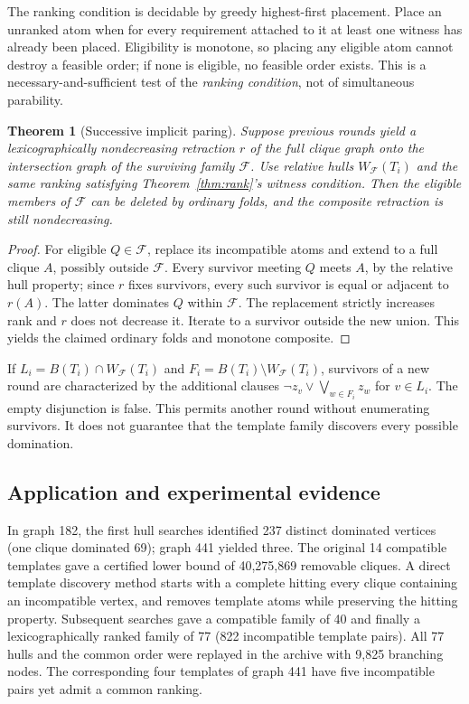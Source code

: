 \documentclass[11pt,a4paper]{article}
\newtheorem{theorem}{Theorem}[section]
\theoremstyle{definition}\newtheorem{definition}[theorem]{Definition}\newtheorem{example}[theorem]{Example}
\theoremstyle{remark}\newtheorem{remark}[theorem]{Remark}
\begin{document}
The ranking condition is decidable by greedy highest-first placement. Place an unranked atom when for every requirement attached to it at least one witness has already been placed. Eligibility is monotone, so placing any eligible atom cannot destroy a feasible order; if none is eligible, no feasible order exists. This is a necessary-and-sufficient test of the \emph{ranking condition}, not of simultaneous parability.
\begin{theorem}[Successive implicit paring]\label{thm:relative}
Suppose previous rounds yield a lexicographically nondecreasing retraction \(r\) of the full clique graph onto the intersection graph of the surviving family \(\mathcal F\). Use relative hulls \(W_{\mathcal F}(T_i)\) and the same ranking satisfying Theorem~\ref{thm:rank}'s witness condition. Then the eligible members of \(\mathcal F\) can be deleted by ordinary folds, and the composite retraction is still nondecreasing.
\end{theorem}
\begin{proof}
For eligible \(Q\in\mathcal F\), replace its incompatible atoms and extend to a full clique \(A\), possibly outside \(\mathcal F\). Every survivor meeting \(Q\) meets \(A\), by the relative hull property; since \(r\) fixes survivors, every such survivor is equal or adjacent to \(r(A)\). The latter dominates \(Q\) within \(\mathcal F\). The replacement strictly increases rank and \(r\) does not decrease it. Iterate to a survivor outside the new union. This yields the claimed ordinary folds and monotone composite.
\end{proof}
If \(L_i=B(T_i)\cap W_{\mathcal F}(T_i)\) and \(F_i=B(T_i)\setminus W_{\mathcal F}(T_i)\), survivors of a new round are characterized by the additional clauses \(\neg z_v\lor\bigvee_{w\in F_i}z_w\) for \(v\in L_i\). The empty disjunction is false. This permits another round without enumerating survivors. It does not guarantee that the template family discovers every possible domination.

\subsection{Application and experimental evidence}
In graph 182, the first hull searches identified 237 distinct dominated vertices (one clique dominated 69); graph 441 yielded three. The original 14 compatible templates gave a certified lower bound of 40,275,869 removable cliques. A direct template discovery method starts with a complete hitting every clique containing an incompatible vertex, and removes template atoms while preserving the hitting property. Subsequent searches gave a compatible family of 40 and finally a lexicographically ranked family of 77 (822 incompatible template pairs). All 77 hulls and the common order were replayed in the archive with 9,825 branching nodes. The corresponding four templates of graph 441 have five incompatible pairs yet admit a common ranking.
\end{document}
